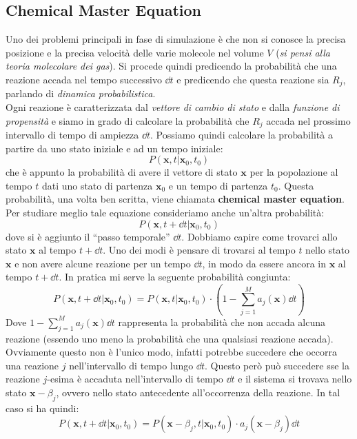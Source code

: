 \documentclass[a4paper,12pt, oneside]{book}
\begin{document}
\subsection{Chemical Master Equation}
Uno dei problemi principali in fase di simulazione è che non si conosce la
precisa posizione e la precisa velocità delle varie molecole nel volume $V$
(\textit{si pensi alla teoria molecolare dei gas}). Si procede quindi predicendo
la probabilità che una reazione accada nel tempo successivo $\dd{t}$ e
predicendo che questa reazione sia $R_j$, parlando di \textit{dinamica
  probabilistica}. \\ 
Ogni reazione è caratterizzata dal \textit{vettore di cambio di stato} e
dalla \textit{funzione di propensità} e siamo in grado di calcolare la
probabilità che $R_j$ accada nel prossimo intervallo di tempo di ampiezza
$\dd{t}$. Possiamo quindi calcolare la probabilità a partire da uno stato
iniziale e ad un tempo iniziale:
\[P(\mathbf{x},t|\mathbf{x}_0,t_0)\]
che è appunto la probabilità di avere il vettore di stato $\mathbf{x}$ per la
popolazione al tempo $t$ dati uno stato di partenza $\mathbf{x}_0$ e un tempo di
partenza $t_0$. Questa probabilità, una volta ben scritta, viene chiamata
\textbf{chemical master equation}.\\
Per studiare meglio tale equazione consideriamo anche un'altra probabilità:
\[P(\mathbf{x},t+\dd{t}|\mathbf{x}_0,t_0)\]
dove si è aggiunto il ``passo temporale'' $\dd{t}$. Dobbiamo capire come
trovarci allo stato $\mathbf{x}$ al tempo $t+\dd{t}$. Uno dei modi è pensare di
trovarsi al tempo $t$ nello stato $\mathbf{x}$ e non avere alcune reazione per
un tempo $\dd{t}$, in modo da essere ancora in $\mathbf{x}$ al tempo
$t+\dd{t}$. In pratica mi serve la seguente probabilità congiunta:
\[P(\mathbf{x},t+\dd{t}|\mathbf{x}_0,t_0)=P(\mathbf{x},t|\mathbf{x}_0,t_0)\cdot
  \left(1-\sum_{j=1}^Ma_j(\mathbf{x})\dd{t}\right)\]
Dove $1-\sum_{j=1}^Ma_j(\mathbf{x})\dd{t}$ rappresenta la probabilità che non
accada alcuna reazione (essendo uno meno la probabilità che una qualsiasi
reazione accada).\\
Ovviamente questo non è l'unico modo, infatti potrebbe succedere che occorra una
reazione $j$ nell'intervallo di tempo lungo $\dd{t}$. Questo però può succedere
sse la reazione $j$-esima è accaduta nell'intervallo di tempo $\dd{t}$ e il
sistema si trovava nello stato $\mathbf{x}-\beta_j$, ovvero nello stato
antecedente all'occorrenza della reazione. In tal caso si ha quindi:
\[P(\mathbf{x},t+\dd{t}|\mathbf{x}_0,t_0)=P(\mathbf{x}-\beta_j,t|
  \mathbf{x}_0,t_0)\cdot a_j(\mathbf{x}-\beta_j)\dd{t}\]
\end{document}
